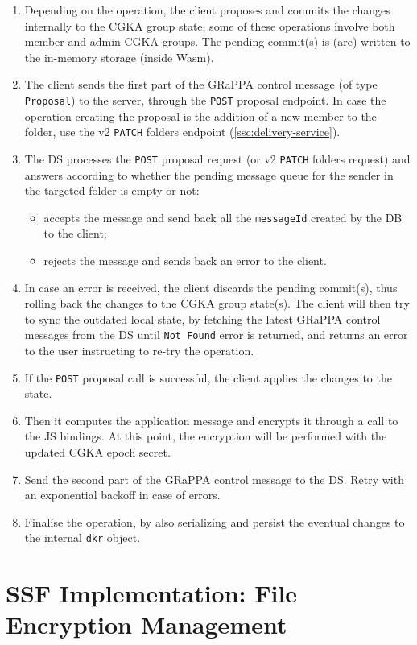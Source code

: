 \begin{enumerate}
    \item Depending on the operation, the client proposes and commits the changes internally to the CGKA group state, some of these operations involve both member and admin CGKA groups. The pending commit(s) is (are) written to the in-memory storage (inside Wasm).
    \item The client sends the first part of the GRaPPA control message (of type \texttt{Proposal}) to the server, through the \texttt{POST} proposal endpoint. In case the operation creating the proposal is the addition of a new member to the folder, use the v2 \texttt{PATCH} folders endpoint (\cref{ssc:delivery-service}).
    \item The DS processes the \texttt{POST} proposal request (or v2 \texttt{PATCH} folders request) and answers according to whether the pending message queue for the sender in the targeted folder is empty or not:
    \begin{itemize}
        \item accepts the message and send back all the \texttt{messageId} created by the DB to the client;
        \item rejects the message and sends back an error to the client.
    \end{itemize}
    \item In case an error is received, the client discards the pending commit(s), thus rolling back the changes to the CGKA group state(s). The client will then try to sync the outdated local state, by fetching the latest GRaPPA control messages from the DS until \texttt{Not Found} error is returned, and returns an error to the user instructing to re-try the operation.
    \item If the \texttt{POST} proposal call is successful, the client applies the changes to the state. 
    \item Then it computes the application message and encrypts it through a call to the JS bindings. At this point, the encryption will be performed with the updated CGKA epoch secret. 
    \item Send the second part of the GRaPPA control message to the DS. Retry with an exponential backoff in case of errors.
    \item Finalise the operation, by also serializing and persist the eventual changes to the internal \texttt{dkr} object.
\end{enumerate}

\section{SSF Implementation: File Encryption Management}\label{sc:ssf-file-encryption}

